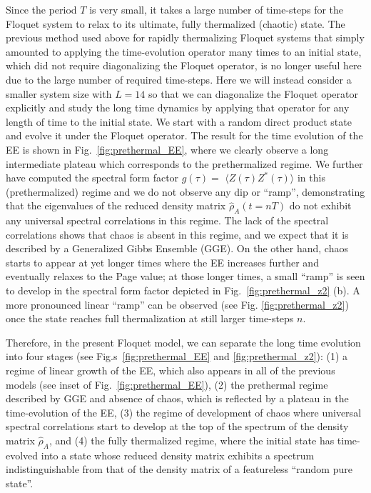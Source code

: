 \documentclass[aps,prb,preprint,onecolumn,amsmath,amssymb,superscriptaddress,eqsecnum,floatfix,scrartcl]{revtex4-1}
\begin{document}
Since the period $T$ is very small, it takes a 
large number  of time-steps for the Floquet system to relax to 
its ultimate,  fully thermalized (chaotic)  state.
The previous method used above for rapidly
 thermalizing Floquet systems 
that
simply amounted to applying the time-evolution operator many times 
to an initial state, 
which did not 
require
diagonalizing the Floquet operator,  is no longer useful here due to the large number of required time-steps.
Here we will instead consider
a smaller system size with $L=14$ so that we can diagonalize the Floquet operator explicitly  and study the long time dynamics
by applying that operator for any  length of time to the initial state.
We start with a  random  direct product state and evolve it under the Floquet operator.  The result for the time evolution of the  EE is shown in Fig.~\ref{fig:prethermal_EE}, where we clearly observe a long  intermediate plateau which corresponds to the 
prethermalized regime. 
We further have computed the spectral form factor 
$g(\tau)=$  $\langle Z(\tau)Z^*(\tau)\rangle$ 
in this (prethermalized)  regime and we do not observe any dip or ``ramp'',
demonstrating that
 the eigenvalues of the reduced density matrix ${\hat \rho}_A(t=nT)$
do not exhibit any universal spectral 
correlations  in this regime. 
The lack of the spectral 
correlations shows that chaos is absent in this regime, and we expect
that it is
described by a Generalized Gibbs Ensemble (GGE).
On the other hand,  chaos starts to
appear at yet longer times where the 
EE increases further
and eventually relaxes to the Page value;
at those longer times, a small ``ramp'' is seen to  develop in the spectral form factor depicted  in Fig.~\ref{fig:prethermal_z2} (b). 
A more pronounced linear ``ramp'' can be observed 
(see Fig. \ref{fig:prethermal_z2}) once the state reaches full thermalization at still  larger
time-steps $n$.


Therefore, in the present  Floquet model, we can separate the long time evolution into four stages 
 (see Fig.s~\ref{fig:prethermal_EE} and
\ref{fig:prethermal_z2}): 
(1) a regime of linear growth of the EE,
which also  appears in all of the previous models (see inset of Fig.~\ref{fig:prethermal_EE}), (2) the prethermal regime described by GGE and absence of chaos,
which is reflected by a plateau in the time-evolution of the EE,
 (3) the regime of 
development  of chaos
where
universal spectral 
correlations start to develop 
at the top of the spectrum  of the density matrix ${\hat \rho}_A$,
and (4) the fully thermalized regime, where the
initial state has time-evolved into a state whose reduced density matrix exhibits a spectrum indistinguishable from that of the density
matrix of a
featureless ``random pure state''. 
\end{document}
